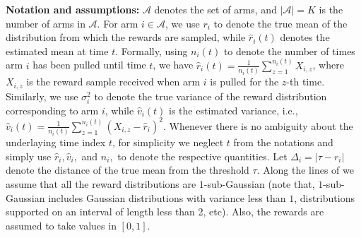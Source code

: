 \textbf{Notation and assumptions:} $\mathcal{A}$ denotes the set of arms, and $|\mathcal{A}|=K$ is the number of arms in $\mathcal{A}$. 
For arm $i\in\mathcal{A}$, we use $r_{i}$ to denote the true mean of the distribution from which the rewards are sampled, while $\hat{r}_{i}(t)$ denotes the estimated mean at time $t$. Formally, using $n_i(t)$ to denote the number of times arm $i$ has been pulled until time $t$, we have $\hat{r}_{i}(t)=\frac{1}{n_{i}(t)}\sum_{z=1}^{n_i(t)} X_{i,z}$, where $X_{i,z}$ is the reward sample received when arm $i$ is pulled for the $z$-th time. %
Similarly, we use $\sigma_{i}^{2}$ to denote the true variance of the reward distribution corresponding to arm $i$, while $\hat{v}_{i}(t)$ is the estimated variance, i.e., $\hat{v}_{i}(t)=\frac{1}{n_i(t)}\sum_{z=1}^{n_{i}(t)}(X_{i,z}-\hat{r}_{i})^{2}$. Whenever there is no ambiguity about the underlaying  time index $t$, for simplicity we neglect $t$ from the notations and simply use  $\hat{r}_i, \hat{v}_i,$ and $n_i, $ to denote the respective quantities.  Let  $\Delta_{i}=|\tau-r_{i}|$ denote the distance of the true mean from the threshold $\tau$. Along the lines of \cite{locatelli2016optimal} we assume that all the reward distributions 
are $1$-sub-Gaussian (note that,  $1$-sub-Gaussian includes Gaussian distributions with variance less than $1$, distributions supported on an interval of length less than 2, etc). Also, the rewards are assumed to take values in $[0,1]$.

